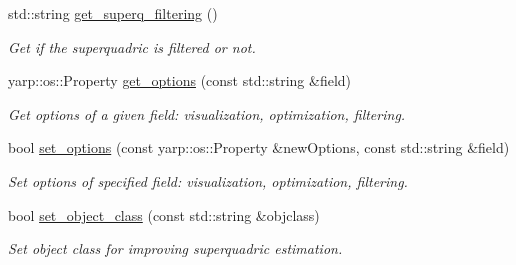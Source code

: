 \begin{DoxyCompactItemize}
std\-::string \hyperlink{classSuperqModule_a66cb1b371b92687d851b5ca23174198b}{get\-\_\-superq\-\_\-filtering} ()
\begin{DoxyCompactList}\small\item\em Get if the superquadric is filtered or not. \end{DoxyCompactList}\item 
yarp\-::os\-::\-Property \hyperlink{classSuperqModule_a18822e0a99dc0b13479f20960c577fb9}{get\-\_\-options} (const std\-::string \&field)
\begin{DoxyCompactList}\small\item\em Get options of a given field\-: visualization, optimization, filtering. \end{DoxyCompactList}\item 
bool \hyperlink{classSuperqModule_a32ccf59ac0572ca77883237dd2d12890}{set\-\_\-options} (const yarp\-::os\-::\-Property \&new\-Options, const std\-::string \&field)
\begin{DoxyCompactList}\small\item\em Set options of specified field\-: visualization, optimization, filtering. \end{DoxyCompactList}\item 
bool \hyperlink{classSuperqModule_aa00f3e123ab12a0c65f864f2900c36e4}{set\-\_\-object\-\_\-class} (const std\-::string \&objclass)
\begin{DoxyCompactList}\small\item\em Set object class for improving superquadric estimation. \end{DoxyCompactList}\end{DoxyCompactItemize}
